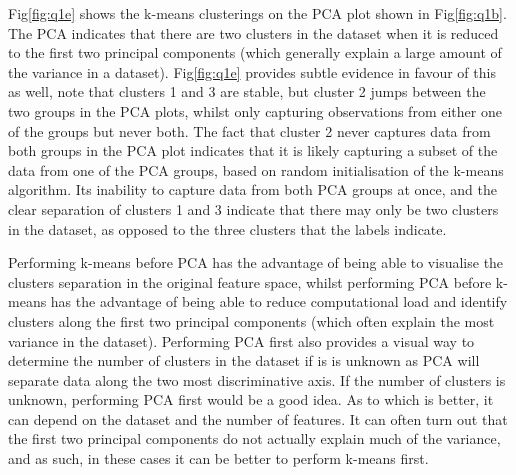     Fig\eqref{fig:q1e} shows the k-means clusterings on the PCA plot shown in Fig\eqref{fig:q1b}.
    The PCA indicates that there are two clusters in the dataset when it is reduced to the first two principal components
    (which generally explain a large amount of the variance in a dataset).
    Fig\eqref{fig:q1e} provides subtle evidence in favour of this as well, note that clusters 1 and 3 are stable, but cluster
    2 jumps between the two groups in the PCA plots, whilst only capturing observations from either one of the groups
    but never both.
    The fact that cluster 2 never captures data from both groups in the PCA plot indicates that it is likely capturing
    a subset of the data from one of the PCA groups, based on random initialisation of the k-means algorithm.
    Its inability to capture data from both PCA groups at once, and the clear separation of clusters 1 and 3 indicate
    that there may only be two clusters in the dataset, as opposed to the three clusters that the labels indicate.

    Performing k-means before PCA has the advantage of being able to visualise the clusters separation in the original
    feature space, whilst performing PCA before k-means has the advantage of being able to reduce computational load
    and identify clusters along the first two principal components (which often explain the most variance in the dataset).
    Performing PCA first also provides a visual way to determine the number of clusters in the dataset if is is unknown as
    PCA will separate data along the two most discriminative axis.
    If the number of clusters is unknown, performing PCA first would be a good idea.
    As to which is better, it can depend on the dataset and the number of features.
    It can often turn out that the first two principal components do not actually explain much of the variance, and as
    such, in these cases it can be better to perform k-means first.
